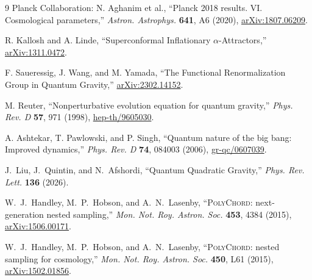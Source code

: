 \documentclass[11pt,a4paper]{article}
\begin{document}
\begin{thebibliography}{9}
Planck Collaboration: N. Aghanim et al., ``Planck 2018 results. VI. Cosmological parameters,'' \textit{Astron. Astrophys.} \textbf{641}, A6 (2020), \href{https://arxiv.org/abs/1807.06209}{arXiv:1807.06209}.

R. Kallosh and A. Linde, ``Superconformal Inflationary $\alpha$-Attractors,'' \href{https://arxiv.org/abs/1311.0472}{arXiv:1311.0472}.

F. Saueressig, J. Wang, and M. Yamada, ``The Functional Renormalization Group in Quantum Gravity,'' \href{https://arxiv.org/abs/2302.14152}{arXiv:2302.14152}.

M. Reuter, ``Nonperturbative evolution equation for quantum gravity,'' \textit{Phys. Rev. D} \textbf{57}, 971 (1998), \href{https://arxiv.org/abs/hep-th/9605030}{hep-th/9605030}.

A. Ashtekar, T. Pawlowski, and P. Singh, ``Quantum nature of the big bang: Improved dynamics,'' \textit{Phys. Rev. D} \textbf{74}, 084003 (2006), \href{https://arxiv.org/abs/gr-qc/0607039}{gr-qc/0607039}.

J.~Liu, J.~Quintin, and N.~Afshordi, ``Quantum Quadratic Gravity,'' \textit{Phys. Rev. Lett.} \textbf{136} (2026).

W.~J.~Handley, M.~P.~Hobson, and A.~N.~Lasenby, ``\textsc{PolyChord}: next-generation nested sampling,'' \textit{Mon. Not. Roy. Astron. Soc.} \textbf{453}, 4384 (2015), \href{https://arxiv.org/abs/1506.00171}{arXiv:1506.00171}.

W.~J.~Handley, M.~P.~Hobson, and A.~N.~Lasenby, ``\textsc{PolyChord}: nested sampling for cosmology,'' \textit{Mon. Not. Roy. Astron. Soc.} \textbf{450}, L61 (2015), \href{https://arxiv.org/abs/1502.01856}{arXiv:1502.01856}.
\end{thebibliography}
\end{document}

